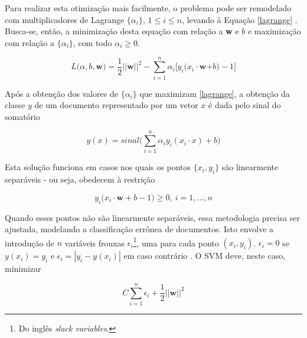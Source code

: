 Para realizar esta otimização mais facilmente, o problema pode ser remodelado com multiplicadores de Lagrange \ensuremath{\{\alpha_i\}}, \ensuremath{1 \leq i \leq n}, levando à Equação \ref{lagrange} \cite{mono-puc}. Busca-se, então, a minimização desta equação com relação a \textbf{w} e \ensuremath{b} e maximização com relação a \ensuremath{\{\alpha_i\}}, com todo \ensuremath{\alpha_i \geq 0}.

\begin{equation}
\label{lagrange}
\ensuremath{L(\alpha, b,}\textbf{w}\ensuremath{) = \frac{1}{2} ||}\textbf{w}\ensuremath{||^2 - \sum_{i = 1}^n \alpha_i\big[y_i(x_i \cdot}\textbf{w}\ensuremath{+ b) -1 \big]} %
\end{equation}

Após a obtenção dos valores de \ensuremath{\{\alpha_i\}} que maximizam \ref{lagrange}, a obtenção da classe \ensuremath{y} de um documento representado por um vetor \ensuremath{x} é dada pelo sinal do somatório

\begin{equation}
\label{result:svm}
\ensuremath{y(x) = sinal\bigg(\sum_{i = 1}^n \alpha_iy_i(x_i \cdot x) + b\bigg)} %
\end{equation}

Esta solução funciona em casos nos quais os pontos \ensuremath{\{x_i, y_i\}} são linearmente separáveis - ou seja, obedecem à restrição

\begin{equation}
\label{restr2:svm}
\ensuremath{y_i(x_i \cdot} \textbf{w} + \ensuremath{b -1) \geq 0,\ i = 1,...,n}
\end{equation}

Quando esses pontos não são linearmente separáveis, essa metodologia precisa ser ajustada, modelando a classificação errônea de documentos. Isto envolve a introdução de \ensuremath{n} variáveis frouxas \ensuremath{\epsilon_i}\footnote{Do inglês \emph{slack variables}.}, uma para cada ponto \ensuremath{(x_i, y_i)}. \ensuremath{\epsilon_i = 0} se \ensuremath{y(x_i) = y_i} e \ensuremath{\epsilon_i = |y_i - y(x_i)|} em caso contrário \cite{bishop}. O SVM deve, neste caso, minimizar

\begin{equation}
\label{nonlin:svm}
\ensuremath{C\sum_{i=1}^n\epsilon_i + \frac{1}{2}||}\textbf{w}\ensuremath{||^2}
\end{equation}

